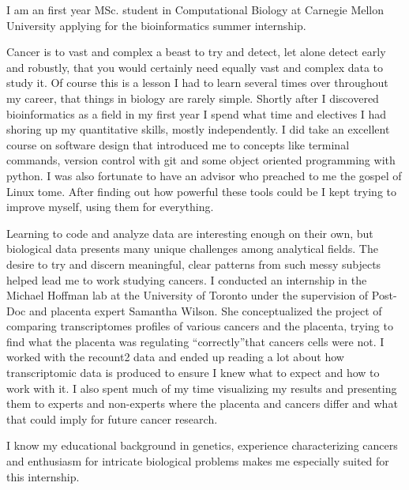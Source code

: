 \documentclass[11pt, a4paper]{./Awesome-CV/awesome-cv}
\begin{document}
\vspace*{\fill}
\makelettertitle %

\begin{cvletter}
\hspace{8mm} I am an first year MSc. student in Computational Biology at Carnegie Mellon University applying for the bioinformatics summer internship.
\par \hspace{8mm}
Cancer is to vast and complex a beast to try and detect, let alone detect early and robustly, that you would certainly need equally vast and complex data to study it.
Of course this is a lesson I had to learn several times over throughout my career, that things in biology are rarely simple.
Shortly after I discovered bioinformatics as a field in my first year I spend what time and electives I had shoring up my quantitative skills, mostly independently.
I did take an excellent course on software design that introduced me to concepts like terminal commands, version control with git and some object oriented programming with python.
I was also fortunate to have an advisor who preached to me the gospel of Linux tome.
After finding out how powerful these tools could be I kept trying to improve myself, using them for everything.
\par \hspace{8mm}
Learning to code and analyze data are interesting enough on their own, but biological data presents many unique challenges among analytical fields.
The desire to try and discern meaningful, clear patterns from such messy subjects helped lead me to work studying cancers.
I conducted an internship in the Michael Hoffman lab at the University of Toronto under the supervision of Post-Doc and placenta expert Samantha Wilson.
She conceptualized the project of comparing transcriptomes profiles of various cancers and the placenta, trying to find what the placenta was regulating “correctly”that cancers cells were not.
I worked with the recount2 data and ended up reading a lot about how transcriptomic data is produced to ensure I knew what to expect and how to work with it.
I also spent much of my time visualizing my results and presenting them to experts and non-experts where the placenta and cancers differ and what that could imply for future cancer research.
\par \hspace{8mm}
I know my educational background in genetics, experience characterizing cancers and enthusiasm for intricate biological problems makes me especially suited for this internship.

\end{cvletter}
\makeletterclosing
\vspace*{\fill}
\end{document}
